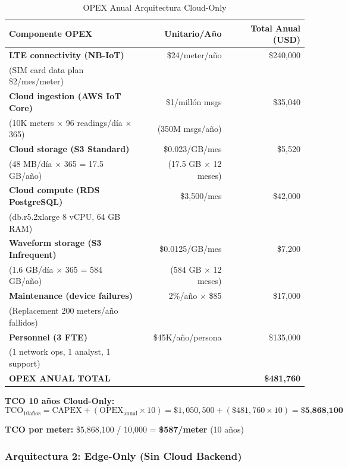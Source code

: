 \begin{table}[H]
\centering
\caption{OPEX Anual Arquitectura Cloud-Only}
\label{tab:opex-cloud-only}
\small
\begin{tabular}{|p{5.5cm}|r|r|}
\hline
\rowcolor{orange!20}
\textbf{Componente OPEX} & \textbf{Unitario/Año} & \textbf{Total Anual (USD)} \\
\hline
\textbf{LTE connectivity (NB-IoT)} & \$24/meter/año & \$240,000 \\
(SIM card data plan \$2/mes/meter) & & \\
\hline
\textbf{Cloud ingestion (AWS IoT Core)} & \$1/millón msgs & \$35,040 \\
(10K meters $\times$ 96 readings/día $\times$ 365) & (350M msgs/año) & \\
\hline
\textbf{Cloud storage (S3 Standard)} & \$0.023/GB/mes & \$5,520 \\
(48 MB/día $\times$ 365 = 17.5 GB/año) & (17.5 GB $\times$ 12 meses) & \\
\hline
\textbf{Cloud compute (RDS PostgreSQL)} & \$3,500/mes & \$42,000 \\
(db.r5.2xlarge 8 vCPU, 64 GB RAM) & & \\
\hline
\textbf{Waveform storage (S3 Infrequent)} & \$0.0125/GB/mes & \$7,200 \\
(1.6 GB/día $\times$ 365 = 584 GB/año) & (584 GB $\times$ 12 meses) & \\
\hline
\textbf{Maintenance (device failures)} & 2\%/año $\times$ \$85 & \$17,000 \\
(Replacement 200 meters/año fallidos) & & \\
\hline
\textbf{Personnel (3 FTE)} & \$45K/año/persona & \$135,000 \\
(1 network ops, 1 analyst, 1 support) & & \\
\hline
\rowcolor{gray!20}
\textbf{OPEX ANUAL TOTAL} & & \textbf{\$481,760} \\
\hline
\end{tabular}
\end{table}

\textbf{TCO 10 años Cloud-Only:}
\begin{equation}
\text{TCO}_{10\text{años}} = \text{CAPEX} + (\text{OPEX}_{\text{anual}} \times 10) = \$1,050,500 + (\$481,760 \times 10) = \textbf{\$5,868,100}
\end{equation}

\textbf{TCO por meter:} \$5,868,100 / 10,000 = \textbf{\$587/meter} (10 años)

\subsubsection{Arquitectura 2: Edge-Only (Sin Cloud Backend)}

